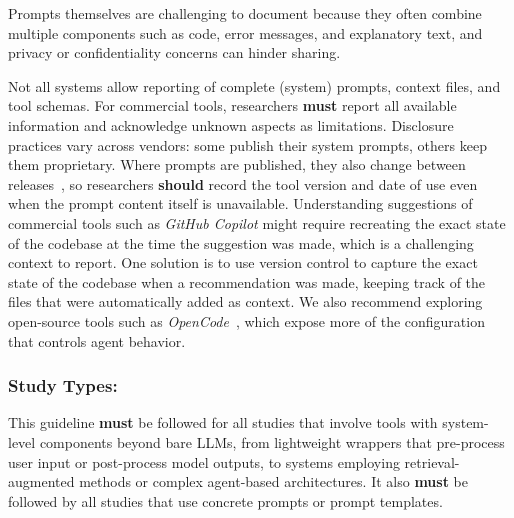 \documentclass[smallextended]{svjour3}
\newcommand{\must}{\textbf{must}\xspace}
\newcommand{\should}{\textbf{should}\xspace}
\newcommand{\guidelinesubsubsection}[1]{\subsubsection{\bfseries #1:}}
\newcommand{\guidelinesubsubsection}[1]{\subsubsection{#1}}
\begin{document}
Prompts themselves are challenging to document because they often combine multiple components such as code, error messages, and explanatory text, and privacy or confidentiality concerns can hinder sharing.

Not all systems allow reporting of complete (system) prompts, context files, and tool schemas.
For commercial tools, researchers \must report all available information and acknowledge unknown aspects as limitations.
Disclosure practices vary across vendors: some publish their system prompts, others keep them proprietary.
Where prompts are published, they also change between releases~\cite{willison2026opus}, so researchers \should record the tool version and date of use even when the prompt content itself is unavailable.
Understanding suggestions of commercial tools such as \emph{GitHub Copilot} might require recreating the exact state of the codebase at the time the suggestion was made, which is a challenging context to report.
One solution is to use version control to capture the exact state of the codebase when a recommendation was made, keeping track of the files that were automatically added as context.
We also recommend exploring open-source tools such as \emph{OpenCode}~\cite{opencode}, which expose more of the configuration that controls agent behavior.

\guidelinesubsubsection{Study Types}

This guideline \must be followed for all studies that involve tools with system-level components beyond bare LLMs, from lightweight wrappers that pre-process user input or post-process model outputs, to systems employing retrieval-augmented methods or complex agent-based architectures.
It also \must be followed by all studies that use concrete prompts or prompt templates.
\end{document}
